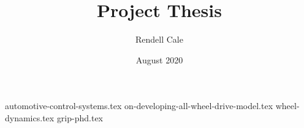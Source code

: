 \documentclass{article}
\title{Project Thesis}
\author{Rendell Cale}
\date{August 2020}
\begin{document}
\maketitle

{automotive-control-systems.tex}
{on-developing-all-wheel-drive-model.tex}
{wheel-dynamics.tex}
{grip-phd.tex}

\printbibliography
\end{document}
